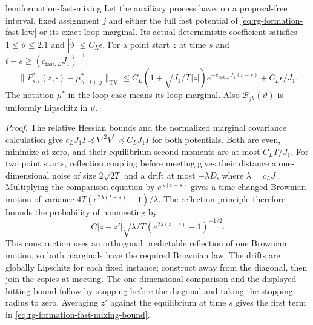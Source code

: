 {lem:formation-fast-mixing}
Let the auxiliary process have, on a proposal-free interval, fixed
assignment $j$ and either the full fast potential of
\cref{eq:rg-formation-fast-law} or its exact loop marginal.
Its actual deterministic coefficient satisfies
$1\le\vartheta\le2.1$ and $|\dot\vartheta|\le C_L\epsilon$.
For a point start $z$ at time $s$ and
$t-s\ge(c_{\mathrm{fast},L}J_1)^{-1}$,
\begin{equation}
 \|P^*_{s,t}(z,\cdot)-\mu^*_{\vartheta(t),j}\|_{\mathrm{TV}}
 \le C_L(1+\sqrt{J_1/T}|z|)
              e^{-c_{\mathrm{fast},L}J_1(t-s)}
       +C_L\epsilon/J_1.
 \label{eq:rg-formation-fast-mixing-bound}
\end{equation}
The notation $\mu^*$ in the loop case means its loop marginal.
Also $\mathcal B_{jk}(\vartheta)$ is uniformly Lipschitz in
$\vartheta$. 

\emph{Proof.}
The relative Hessian bounds and the normalized marginal covariance
calculation give
$c_LJ_1I\preceq\nabla^2V^*\preceq C_LJ_1I$ for both potentials.
Both are even, minimize at zero, and their equilibrium second
moments are at most $C_LT/J_1$.
For two point starts, reflection coupling before meeting gives their
distance a one-dimensional noise of size $2\sqrt{2T}$ and a drift
at most $-\lambda D$, where $\lambda=c_LJ_1$.
Multiplying the comparison equation by $e^{\lambda(t-s)}$ gives
a time-changed Brownian motion of variance
$4T(e^{2\lambda(t-s)}-1)/\lambda$.
The reflection principle therefore bounds the probability of
nonmeeting by
\begin{equation}
 C|z-z'|\sqrt{\lambda/T}
                 (e^{2\lambda(t-s)}-1)^{-1/2}.
 \label{eq:rg-formation-reflection-bound}
\end{equation}
This construction uses an orthogonal predictable reflection of one
Brownian motion, so both marginals have the required Brownian law.
The drifts are globally Lipschitz for each fixed instance; construct
away from the diagonal, then join the copies at meeting. The
one-dimensional comparison and the displayed hitting bound follow
by stopping before the diagonal and taking the stopping radius to
zero. Averaging $z'$ against the equilibrium at time $s$ gives the
first term in \cref{eq:rg-formation-fast-mixing-bound}.

